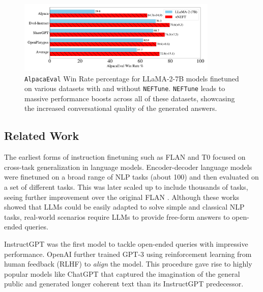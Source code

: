 \documentclass{article} %
\newcommand{\neftune}{\texttt{NEFTune}}
\newcommand{\llama}{LLaMA}
\begin{document}
\begin{figure}[ht!]
    \centering
    \vspace{-.3cm}
    \includegraphics[width=0.85\textwidth]{figures/AlpacaEval_BlueColors_Figue1.pdf}
    \vspace{-.2cm}
    \caption{\texttt{AlpacaEval} Win Rate percentage for \llama{}-2-7B models finetuned on various datasets with and without \neftune{}. \neftune{} leads to massive performance boosts across all of these datasets, showcasing the increased conversational quality of the generated answers. 
    }
    \label{fig:figure_1_results_AlpacaEval}
\end{figure}


\subsection{Related Work}

The earliest forms of instruction finetuning such as FLAN and T0 \citep{sanh2021multitask-T0, wei2021finetuned-FLAN} focused on cross-task generalization in language models. 
Encoder-decoder language models were finetuned on a broad range of NLP tasks (about 100) and then evaluated on a set of different tasks. 
This was later scaled up to include thousands of tasks, seeing further improvement over the original FLAN \citep{FLANchung2022scaling, xu2022zeroprompt}. Although these works showed that LLMs could be easily adapted to solve simple and classical NLP tasks, real-world scenarios require LLMs to provide free-form answers to open-ended queries.

InstructGPT \citep{InstructGPT} was the first model to tackle open-ended queries with impressive performance. OpenAI further trained GPT-3 \citep{brown2020language} using reinforcement learning from human feedback (RLHF) to \textit{align} the model.
This procedure gave rise to highly popular models like ChatGPT \citep{OpenAIchatGPT} that captured the imagination of the general public and generated longer coherent text than its InstructGPT predecessor. 
\end{document}
